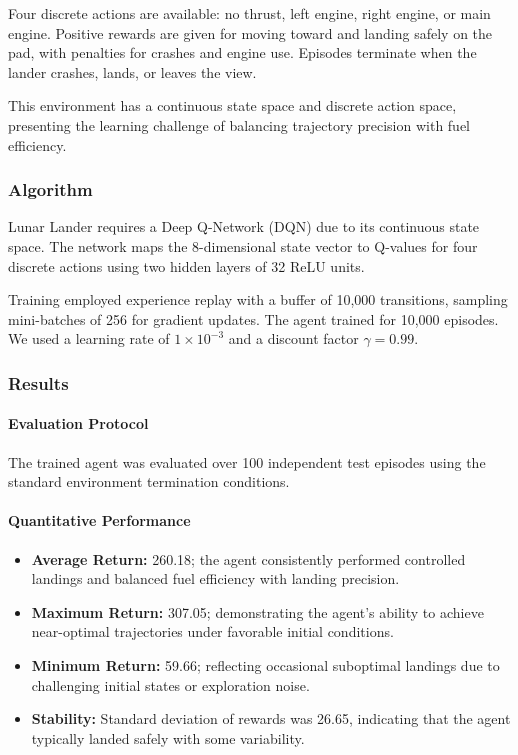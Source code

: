 \documentclass[10pt]{article}
\begin{document}
Four discrete actions are available: no thrust, left engine, right engine, or main engine. Positive rewards are given for moving toward and landing safely on the pad, with penalties for crashes and engine use. Episodes terminate when the lander crashes, lands, or leaves the view.

This environment has a continuous state space and discrete action space, presenting the learning challenge of balancing trajectory precision with fuel efficiency.

\subsubsection{Algorithm}
Lunar Lander requires a Deep Q-Network (DQN) due to its continuous state space. The network maps the 8-dimensional state vector to Q-values for four discrete actions using two hidden layers of 32 ReLU units.

Training employed experience replay with a buffer of 10,000 transitions, sampling mini-batches of 256 for gradient updates. The agent trained for 10,000 episodes.
We used a learning rate of $1\times 10^{-3}$ and a discount factor $\gamma = 0.99$.

\subsubsection{Results}
\paragraph{Evaluation Protocol}
The trained agent was evaluated over 100 independent test episodes using the standard environment termination conditions.

\paragraph{Quantitative Performance}
\begin{itemize}[leftmargin=*]
  \item \textbf{Average Return:} 260.18; the agent consistently performed controlled landings and balanced fuel efficiency with landing precision.
  \item \textbf{Maximum Return:} 307.05; demonstrating the agent’s ability to achieve near-optimal trajectories under favorable initial conditions.
  \item \textbf{Minimum Return:} 59.66; reflecting occasional suboptimal landings due to challenging initial states or exploration noise.
  \item \textbf{Stability:} Standard deviation of rewards was 26.65, indicating that the agent typically landed safely with some variability.
\end{itemize}
\end{document}
